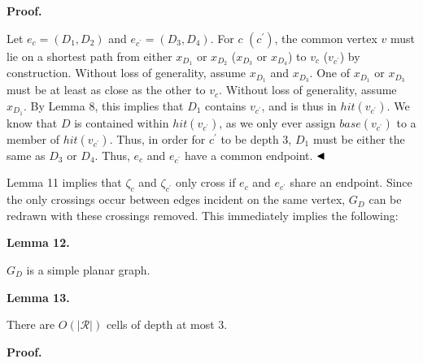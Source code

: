 \documentclass[10pt,a4paper]{article}
\begin{document}
\par
\par
\par
\par\medskip\noindent\textbf{Proof.}\par
Let $e_{c}=(D_{1},D_{2})$ and $e_{c^{\prime}}=(D_{3},D_{4})$. For $c$ $(c^{\prime})$, the common vertex $v$ must lie on a shortest path from either $x_{D_{1}}$ or $x_{D_{2}}$ ($x_{D_{3}}$ or $x_{D_{4}}$) to $v_{c}$ ($v_{c^{\prime}}$) by construction. Without loss of generality, assume $x_{D_{1}}$ and $x_{D_{3}}$. One of $x_{D_{1}}$ or $x_{D_{3}}$ must be at least as close as the other to $v_{c}$. Without loss of generality, assume $x_{D_{1}}$. By Lemma 8, this implies that $D_{1}$ contains $v_{c^{\prime}}$, and is thus in $\mathit{hit}(v_{c^{\prime}})$. We know that $D$ is contained within $\mathit{hit}(v_{c^{\prime}})$, as we only ever assign $\mathit{base}(v_{c^{\prime}})$ to a member of $\mathit{hit}(v_{c^{\prime}})$. Thus, in order for $c^{\prime}$ to be depth 3, $D_{1}$ must be either the same as $D_{3}$ or $D_{4}$. Thus, $e_{c}$ and $e_{c^{\prime}}$ have a common endpoint. $\hfill\blacktriangleleft$
\par
\par
Lemma 11 implies that $\zeta_{c}$ and $\zeta_{c^{\prime}}$ only cross if $e_{c}$ and $e_{c^{\prime}}$ share an endpoint. Since the only crossings occur between edges incident on the same vertex, $G_{D}$ can be redrawn with these crossings removed. This immediately implies the following:
\par
\par
\par\medskip\noindent\textbf{Lemma 12.}\par
$G_{D}$ is a simple planar graph.
\par
\par
\par
\par\medskip\noindent\textbf{Lemma 13.}\par
There are $O(|\mathcal{R}|)$ cells of depth at most 3.
\par
\par
\par
\par\medskip\noindent\textbf{Proof.}\par
\end{document}

